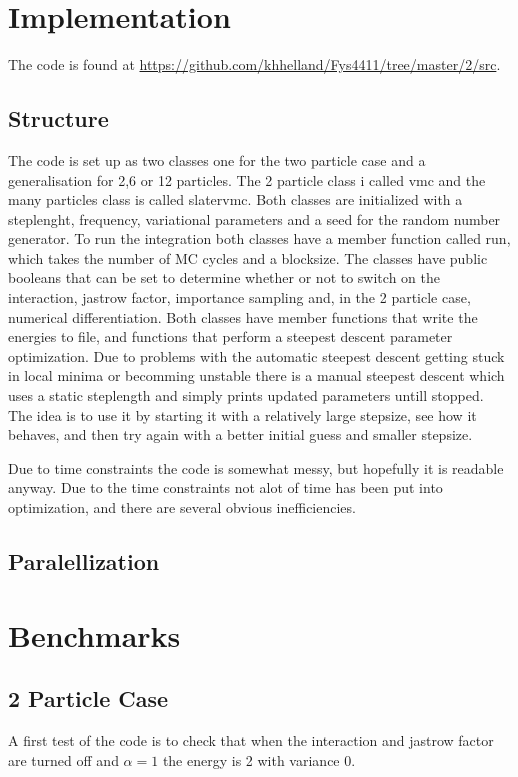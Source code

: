 \documentclass[a4paper,English,10pt]{article}
\begin{document}
\section{Implementation}
The code is found at \url{https://github.com/khhelland/Fys4411/tree/master/2/src}.

\subsection{Structure}
The code is set up as two classes one for the two particle case and a generalisation for 2,6 or 12 particles.
The 2 particle class i called vmc and the many particles class is called slatervmc. Both classes are initialized with a steplenght, frequency,
variational parameters and a seed for the random number generator. To run the integration both classes have a member function called run, which takes
the number of MC cycles and a blocksize. The classes have public booleans that can be set to determine whether or not to switch on the interaction,
jastrow factor, importance sampling and, in the 2 particle case, numerical differentiation. Both classes have member functions that write the energies to file,
and functions that perform a steepest descent parameter optimization. Due to problems with the automatic steepest descent getting stuck in local minima or becomming unstable
there is a manual steepest descent which uses a static steplength and simply prints updated parameters untill stopped. The idea is to use it by starting it with a relatively large
stepsize, see how it behaves, and then try again with a better initial guess and smaller stepsize.

Due to time constraints the code is somewhat messy, but hopefully it is readable anyway.
Due to the time constraints not alot of time has been put into optimization, and there are several obvious inefficiencies.

\subsection{Paralellization}




\section{Benchmarks}

\subsection{2 Particle Case}
A first test of the code is to check that when the interaction and jastrow factor are turned off and $\alpha = 1$ the energy is 2 with variance 0.
\end{document}
